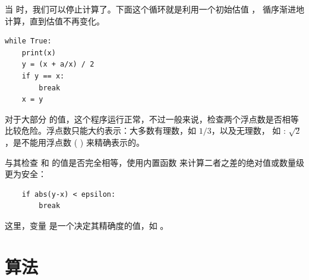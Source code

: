 %

当  时，我们可以停止计算了。下面这个循环就是利用一个初始估值 ，
循序渐进地计算，直到估值不再变化。

\begin{lstlisting}
while True:
    print(x)
    y = (x + a/x) / 2
    if y == x:
        break
    x = y
\end{lstlisting}

%

对于大部分  的值，这个程序运行正常，不过一般来说，检查两个浮点数是否相等比较危险。浮点数只能大约表示：大多数有理数，如 $1/3$，以及无理数，
如 : $\sqrt{2}$，是不能用浮点数 (  ) 来精确表示的。
  


与其检查  和  的值是否完全相等，使用内置函数  来计算二者之差的绝对值或数量级更为安全：

\begin{lstlisting}
    if abs(y-x) < epsilon:
        break
\end{lstlisting}

%

这里，变量  是一个决定其精确度的值，如 。

\section{算法}
  


